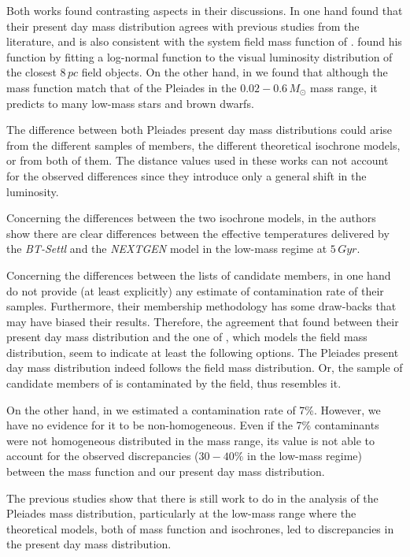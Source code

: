 Both works found contrasting aspects in their discussions. In one hand \citet{Lodieu2012} found that their present day mass distribution agrees with previous studies from the literature, and is also consistent with the system field mass function of \citet{Chabrier2005}. \citet{Chabrier2005} found his function by fitting a log-normal function to the visual luminosity distribution of the closest $8 \,pc$ field objects. On the other hand, in \citet{Bouy2015} we found that although the \citet{Chabrier2005} mass function match that of the Pleiades in the $0.02-0.6\,M_{\odot}$ mass range, it predicts to many low-mass stars and brown dwarfs. 

The difference between both Pleiades present day mass distributions could arise from the different samples of members,  the different theoretical isochrone models, or from both of them. The distance values used in these works can not account for the observed differences since they introduce only a general shift in the luminosity. 

Concerning the differences between the two isochrone models, in \citet{2013MmSAI..84.1053A} the authors show there are clear differences between the effective temperatures delivered by the \emph{BT-Settl} and the \emph{NEXTGEN} model in the low-mass regime at $5 \,Gyr$.  

Concerning the differences between the lists of candidate members, in one hand \citet{Lodieu2012} do not provide (at least explicitly) any estimate of contamination rate of their samples. Furthermore, their membership methodology has some draw-backs \cite[see][]{Sarro2014} that may have biased their results. Therefore, the agreement that \citet{Lodieu2012} found between their present day mass distribution and the one of \citet{Chabrier2005}, which models the field mass distribution, seem to indicate at least the following options. The Pleiades present day mass distribution indeed follows the field mass distribution. Or, the sample of candidate members of \citet{Lodieu2012} is contaminated by the field, thus resembles it.  

On the other hand, in \citet{Bouy2015} we estimated a contamination rate of 7\%. However, we have no evidence for it to be non-homogeneous. Even if the 7\% contaminants were not homogeneous distributed in the mass range, its value is not able to account for the observed discrepancies ($30-40\%$ in the low-mass regime) between the \citet{Chabrier2005} mass function and our present day mass distribution.

The previous studies show that there is still work to do in the analysis of the Pleiades mass distribution, particularly at the low-mass range where the theoretical models, both of mass function and isochrones, led to discrepancies in the present day mass distribution.  

